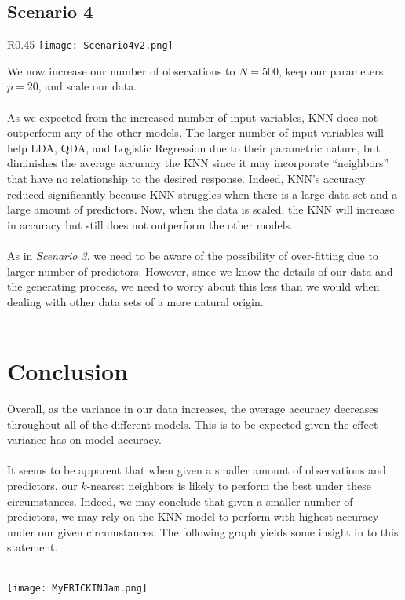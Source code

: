 \documentclass[11pt, oneside]{article}
\begin{document}
\pagebreak

\subsection{Scenario 4}
\begin{wrapfigure}[]{R}{0.45\textwidth}
\vspace{-0.55cm}
\texttt{[image: Scenario4v2.png]}
\vspace{-0.75cm}
\end{wrapfigure}
We now increase our number of observations to $N=500$, keep our parameters $p=20$, and scale our data.\\
\\
As we expected from the increased number of input variables, KNN does not outperform any of the other models. The larger number of input variables will help LDA, QDA, and Logistic Regression due to their parametric nature, but diminishes the average accuracy the KNN since it may incorporate ``neighbors'' that have no relationship to the desired response. Indeed, KNN’s accuracy reduced significantly because KNN struggles when there is a large data set and a large amount of predictors. Now, when the data is scaled, the KNN will increase in accuracy but still does not outperform the other models.\\
\\
As in \emph{Scenario 3}, we need to be aware of the possibility of over-fitting due to larger number of predictors. However, since we know the details of our data and the generating process, we need to worry about this less than we would when dealing with other data sets of a more natural origin.\\
\\







\section{Conclusion}

Overall, as the variance in our data increases, the average accuracy decreases throughout all of the different models. This is to be expected given the effect variance has on model accuracy.\\
\\
It seems to be apparent that when given a smaller amount of observations and predictors, our $k$-nearest neighbors is likely to perform the best under these circumstances. Indeed, we may conclude that given a smaller number of predictors, we may rely on the KNN model to perform with highest accuracy under our given circumstances. The following graph yields some insight in to this statement.\\
\\
\begin{center}
\graphicspath{ {MyFRICKINJam.png} }
\texttt{[image: MyFRICKINJam.png]}
\end{center}
\end{document}
